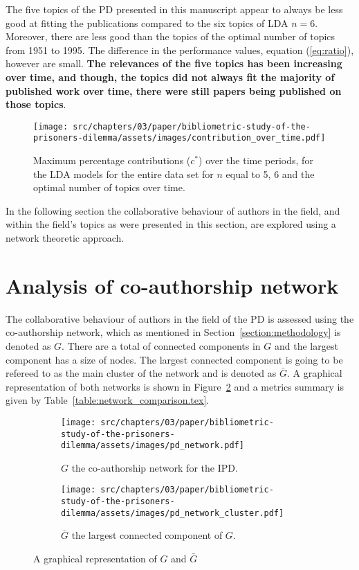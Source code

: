 The five topics of the PD presented in this manuscript appear to always be
less good at fitting the publications compared to the six topics of LDA \(n=6\).
Moreover, there are less good than the topics of the optimal number of topics
from 1951 to 1995. The difference in the performance values, equation (\ref{eq:ratio}),
however are small. \textbf{The relevances of the five topics has been increasing
over time, and though, the topics did not always fit the majority of published
work over time, there were still papers being published on those topics}.

\begin{figure}[!hbtp]
    \centering
    \texttt{[image: src/chapters/03/paper/bibliometric-study-of-the-prisoners-dilemma/assets/images/contribution\_over\_time.pdf]}
    \caption{Maximum percentage contributions (\(c^*\)) over the time periods,
    for the LDA models for the entire data set for \(n\) equal to 5, 6
    and the optimal number of topics over time.}
    \label{fig:median_percentage_contribution_over_time}
\end{figure}

In the following section the collaborative behaviour of authors in the field,
and within the field's topics as were presented in this section, are explored
using a network theoretic approach.

\section{Analysis of co-authorship network}\label{section:co_authorship}

The collaborative behaviour of authors in the field of the PD is assessed using
the co-authorship network, which as mentioned in
Section~\ref{section:methodology} is denoted as \(G\). There are a total of
\connectedcomponents connected components in \(G\) and the largest component has
a size of \largestcc nodes. The largest connected component is going to be
refereed to as the main cluster of the network and is denoted as \(\bar{G}\). A
graphical representation of both networks is shown in
Figure~\ref{fig:graphical_representation_graphs} and a metrics summary is given
by Table~\ref{table:network_comparison.tex}.

\begin{figure}[!hbtp]\vspace{-2cm}
    \begin{subfigure}{.95\textwidth}\centering
        \texttt{[image: src/chapters/03/paper/bibliometric-study-of-the-prisoners-dilemma/assets/images/pd\_network.pdf]}
        \caption{\(G\) the co-authorship network for the IPD.}
    \end{subfigure}\hfill
    \begin{subfigure}{.95\textwidth}\centering
        \texttt{[image: src/chapters/03/paper/bibliometric-study-of-the-prisoners-dilemma/assets/images/pd\_network\_cluster.pdf]}
        \caption{\(\bar{G}\) the largest connected component of \(G\).}
     \end{subfigure}
     \caption{A graphical representation of \(G\) and \(\bar{G}\)}\label{fig:graphical_representation_graphs}
\end{figure}

